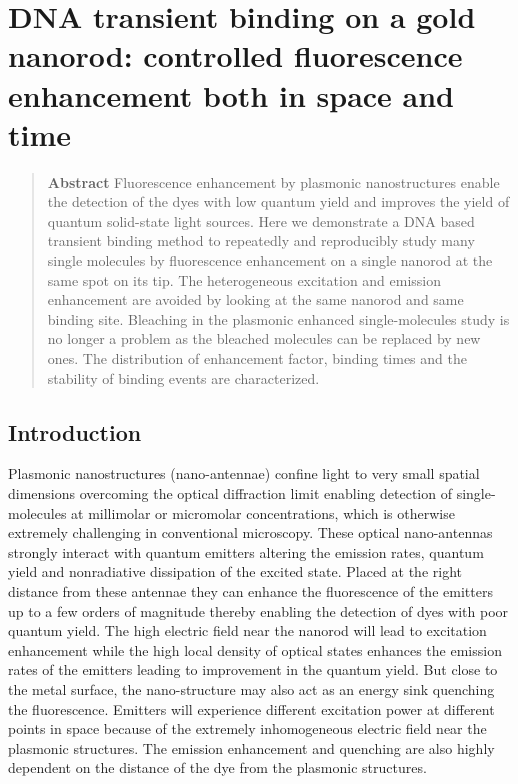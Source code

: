 \chapter{DNA transient binding on a gold nanorod: controlled fluorescence enhancement both in space and time}
\label{chapter:transient}
\graphicspath{{./chapters/c5_transient_binding/figures/}}

\begin{abstract}
  \textbf{Abstract} Fluorescence enhancement by plasmonic nanostructures enable the detection of the dyes with low quantum yield and improves the yield of quantum solid-state light sources.
  Here we demonstrate a DNA based transient binding method to repeatedly and reproducibly study many single molecules by fluorescence enhancement on a single nanorod at the same spot on its tip.
  The heterogeneous excitation and emission enhancement are avoided by looking at the same nanorod and same binding site.
  Bleaching in the plasmonic enhanced single-molecules study is no longer a problem as the bleached molecules can be replaced by new ones.
  The distribution of enhancement factor, binding times and the stability of binding events are characterized.
\end{abstract}

\newpage
\section{Introduction}
Plasmonic nanostructures (nano-antennae) confine light to very small spatial dimensions overcoming the optical diffraction limit enabling detection of single-molecules at millimolar or micromolar concentrations, which is otherwise extremely challenging in conventional microscopy.\cite{levene2003zeromode,punj2013a,schuller2010plasmonics}
These optical nano-antennas strongly interact with quantum emitters altering the emission rates, quantum yield and nonradiative dissipation of the excited state.
Placed at the right distance from these antennae they can enhance the fluorescence of the emitters up to a few orders of magnitude thereby enabling the detection of dyes with poor quantum yield.\cite{lakowicz2005radiative,anger2006enhancement,kinkhabwala2009large,acuna2012fluorescence,yuan2013thousandfold,khatua2014resonant}
The high electric field near the nanorod will lead to excitation enhancement while the high local density of optical states enhances the emission rates of the emitters leading to improvement in the quantum yield.
But close to the metal surface, the nano-structure may also act as an energy sink quenching the fluorescence.\cite{seelig2007nanoparticleinduced,muskens2007strong,acuna2012distance,matsuzaki2017strong}
Emitters will experience different excitation power at different points in space because of the extremely inhomogeneous electric field near the plasmonic structures.
The emission enhancement and quenching are also highly dependent on the distance of the dye from the plasmonic structures.


